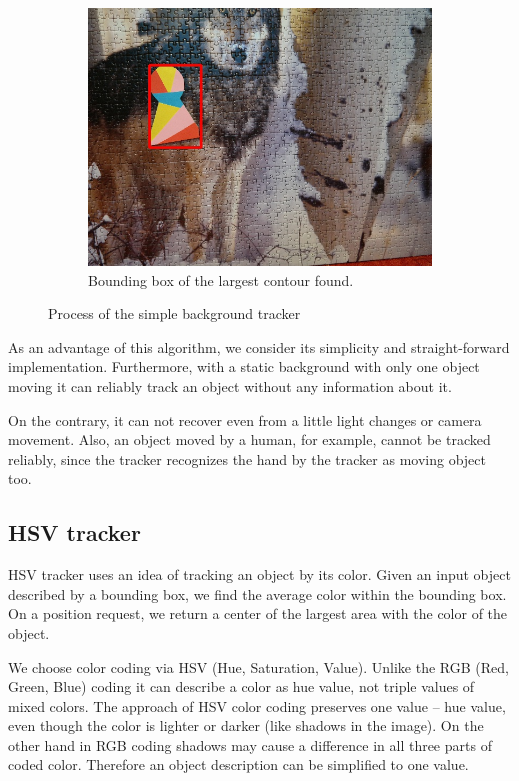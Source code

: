 \begin{figure}
\begin{subfigure}[b]{0.48\linewidth}
    \includegraphics[width=\linewidth]{img/simple_background/result.jpg}
    \caption{Bounding box of the largest contour found.}
  \end{subfigure}
  \caption{Process of the simple background tracker}
  \label{fig:simple-background-tracker}
\end{figure}

As an advantage of this algorithm, we consider its simplicity and
straight-forward implementation. Furthermore, with a static background with
only one object moving it can reliably track an object without any information
about it.

On the contrary, it can not recover even from a little light changes or camera
movement. Also, an object moved by a human, for example, cannot be tracked
reliably, since the tracker recognizes the hand by the tracker as moving object
too.

\subsection{HSV tracker}

HSV tracker uses an idea of tracking an object by its color. Given an input
object described by a bounding box, we find the average color within the
bounding box. On a position request, we return a center of the largest area
with the color of the object.

We choose color coding via HSV (Hue, Saturation, Value). Unlike the RGB (Red,
Green, Blue) coding it can describe a color as hue value, not triple values of
mixed colors. The approach of HSV color coding preserves one value -- hue
value,  even though the color is lighter or darker (like shadows in the image).
On the other hand in RGB coding shadows may cause a difference in all three
parts of coded color. Therefore an object description can be simplified
to one value.

